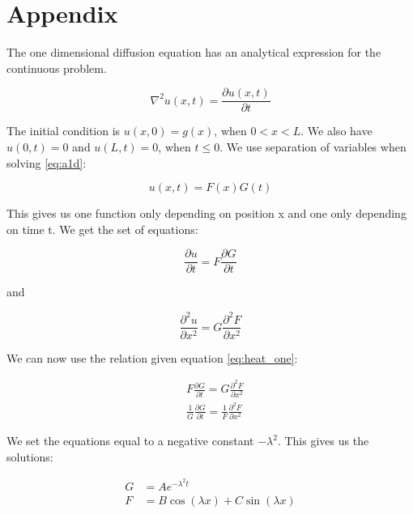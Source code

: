 \documentclass{article}
\begin{document}
\section{Appendix}

The one dimensional diffusion equation has an analytical expression for the continuous problem. 

\begin{equation}
\nabla ^2 u(x,t)=\frac{\partial u(x,t)}{\partial t}
\label{eq:a1d}
\end{equation}

The initial condition is $u(x,0)=g(x)$, when $0<x<L$. We also have $u(0,t)=0$ and $u(L,t)=0$, when $t\leq0$. We use separation of variables when solving \ref{eq:a1d}:

\begin{equation}
u(x,t) = F(x)G(t)
\label{eq:sep}
\end{equation}

This gives us one function only depending on position x and one only depending on time t. We get the set of equations:

\begin{equation*}
\frac{\partial u}{\partial t} = F \frac{\partial G}{\partial t}
\end{equation*}

and

\begin{equation*}
\frac{\partial^2 u}{\partial x^2} = G \frac{\partial^2 F}{\partial x^2}
\end{equation*}

We can now use the relation given equation \ref{eq:heat_one}:

\begin{equation}
\begin{split}
&F\frac{\partial G}{\partial t} = G \frac{\partial ^2 F}{\partial x^2}\\
&\frac{1}{G}\frac{\partial G}{\partial t} = \frac{1}{F} \frac{\partial^2 F}{\partial x^2}
\end{split}
\end{equation}

We set the equations equal to a negative constant $-\lambda^2$. This gives us the solutions:

\begin{equation*}
\begin{split}
G &= Ae^{-\lambda^2 t}\\
F &= B\cos{(\lambda x)} + C\sin{(\lambda x)}
\end{split}
\end{equation*} 
\end{document}
